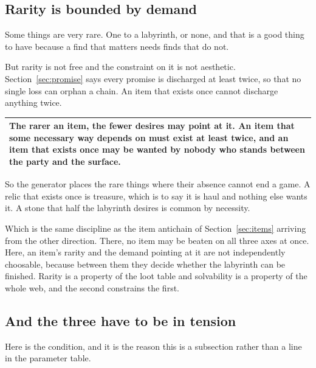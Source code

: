 \documentclass[11pt,a4paper]{article}
\begin{document}
\subsection{Rarity is bounded by demand}
\label{sec:rarity}

Some things are very rare. One to a labyrinth, or none, and that is a good thing to have because a
find that matters needs finds that do not.

But rarity is not free and the constraint on it is not aesthetic. Section~\ref{sec:promise} says
every promise is discharged at least twice, so that no single loss can orphan a chain. An item that
exists once cannot discharge anything twice.

\begin{center}
\begin{tabular}{@{}>{\raggedright\arraybackslash}p{}@{}}
\toprule
\textbf{The rarer an item, the fewer desires may point at it. An item that some necessary way
depends on must exist at least twice, and an item that exists once may be wanted by nobody who
stands between the party and the surface.} \\
\bottomrule
\end{tabular}
\end{center}

So the generator places the rare things where their absence cannot end a game. A relic that exists
once is treasure, which is to say it is haul and nothing else wants it. A stone that half the
labyrinth desires is common by necessity.

\begin{sectionbox}
Which is the same discipline as the item antichain of Section~\ref{sec:items} arriving from the
other direction. There, no item may be beaten on all three axes at once. Here, an item's rarity and
the demand pointing at it are not independently choosable, because between them they decide whether
the labyrinth can be finished. Rarity is a property of the loot table and solvability is a property
of the whole web, and the second constrains the first.
\end{sectionbox}

\subsection{And the three have to be in tension}

Here is the condition, and it is the reason this is a subsection rather than a line in the
parameter table.
\end{document}
